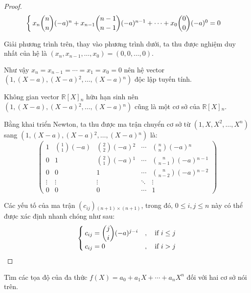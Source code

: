 \documentclass[class=linearalgebra,crop=false]{standalone}
\begin{document}
\begin{proof}
\[\begin{cases}
            x_{n}\dbinom{n}{n}(-a){}^{n} + x_{n-1}\dbinom{n-1}{n-1}(-a){}^{n-1} + \cdots + x_{0}\dbinom{0}{0}(-a){}^{0} = 0
        \end{cases}
    \]
    \par Giải phương trình trên, thay vào phương trình dưới, ta thu được nghiệm duy nhất của hệ là $(x_{n}, x_{n-1},\ldots, x_{0}) = (0,0,\ldots, 0)$.
    \par Như vậy $x_{n} = x_{n-1} = \cdots = x_{1} = x_{0} = 0$ nên hệ vector $(1, (X - a), (X - a){}^{2}, \ldots, (X - a){}^{n})$ độc lập tuyến tính.
    \par Không gian vector $\mathbb{R}[X]{}_{n}$ hữu hạn sinh nên $(1, (X-a), (X-a){}^{2},\ldots, (X-a){}^{n})$ cũng là một cơ sở của $\mathbb{R}[X]{}_{n}$.

    \bigskip
    \par Bằng khai triển Newton, ta thu được ma trận chuyển cơ sở từ $(1, X, X^{2}, \ldots, X^{n})$ sang $(1, (X-a), (X-a){}^{2}, \ldots, (X-a){}^{n})$ là:
    \[
        \begin{pmatrix}
            1      & \binom{1}{1}(-a) & \binom{2}{2}(-a){}^{2} & \cdots & \binom{n}{n}(-a){}^{n}     \\
            0      & 1                & \binom{2}{1}(-a){}^{1} & \cdots & \binom{n}{n-1}(-a){}^{n-1} \\
            0      & 0                & 1                      & \cdots & \binom{n}{n-2}(-a){}^{n-2} \\
            \vdots & \vdots           & \vdots                 & \ddots & \vdots                     \\
            0      & 0                & 0                      & \cdots & 1
        \end{pmatrix}
    \]
    \par Các yếu tố của ma trận $(c_{ij}){}_{(n+1)\times(n+1)}$, trong đó, $0\le i, j \le n$ này có thể được xác định nhanh chóng như sau:
    \[
        \begin{cases}
            c_{ij} = \dbinom{j}{i}(-a){}^{j - i} & ,\quad\text{if $i\le j$} \\
            c_{ij} = 0                           & ,\quad\text{if $i > j$}
        \end{cases}
    \]
\end{proof}

\begin{exercise}Tìm các tọa độ của đa thức $f(X) = a_{0} + a_{1}X + \cdots + a_{n}X^{n}$ đối với hai cơ sở nói trên.
\end{exercise}
\end{document}
